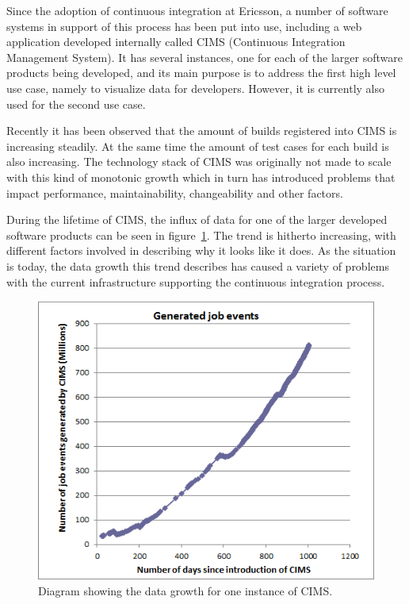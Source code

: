 Since the adoption of continuous integration at Ericsson, a number of software systems in support of this process has been put into use, including a web application developed internally called CIMS (Continuous Integration Management System). It has several instances, one for each of the larger software products being developed, and its main purpose is to address the first high level use case, namely to visualize data for developers. However, it is currently also used for the second use case.

Recently it has been observed that the amount of builds registered into CIMS is increasing steadily. At the same time the amount of test cases for each build is also increasing. The technology stack of CIMS was originally not made to scale with this kind of monotonic growth which in turn has introduced problems that impact performance, maintainability, changeability and other factors.

During the lifetime of CIMS, the influx of data for one of the larger developed software products can be seen in figure~\ref{fig:jeTrend}. The trend is hitherto increasing, with different factors involved in describing why it looks like it does. As the situation is today, the data growth this trend describes has caused a variety of problems with the current infrastructure supporting the continuous integration process.

\begin{figure}[h!]
\centering
\includegraphics[scale=0.65]{figure/jeTrend.png}
\caption{Diagram showing the data growth for one instance of CIMS.}
\label{fig:jeTrend}
\end{figure}

